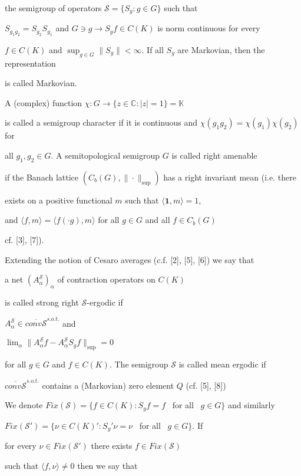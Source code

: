 \documentclass{amsart}
\theoremstyle{definition}
\theoremstyle{remark}
\numberwithin{equation}{section}
\begin{document}
the semigroup of operators $\mathcal{S} = \{ S_g : g\in G \}$ such that

$S_{g_1g_2} = S_{g_2}S_{g_1}$ and $G \ni g \to S_gf \in C(K)$ is norm continuous for every

$f\in C(K)$ and $\sup_{g\in G} \| S_g \| < \infty$. If all $S_g$ are Markovian, then the representation

is called Markovian.

A (complex) function $\chi : G \to \{ z\in \mathbb{C} : |z| = 1 \} = \mathbb{K} $

is called a semigroup character if it is continuous and $\chi(g_1g_2) = \chi (g_1)\chi (g_2)$ for

all $g_1, g_2 \in G$. A semitopological semigroup $G$ is called right amenable

if the Banach lattice  $(C_b(G), \| \cdot \|_{\sup}) $ has a right invariant mean (i.e. there

exists on  a positive functional $m$ such that $\langle \mathbf{1} , m \rangle  = 1, $

and $\langle f, m \rangle = \langle f(\cdot g), m \rangle  $ for all $g\in G $ and all $f\in C_b(G)$

cf. [3], [7]).



Extending the notion of Cesaro averages (c.f. [2], [5], [6]) we say that

a net $(A_{\alpha }^{\mathcal{S}})_{\alpha }$ of contraction operators on $C(K)$

is called strong right $\mathcal{S}$-ergodic if

$A_{\alpha}^{\mathcal{S}} \in \overline{conv\mathcal{S}}^{s.o.t.}$ and

$\lim_{\alpha} \| A_{\alpha}^{\mathcal{S}}f -  A_{\alpha}^{\mathcal{S}}S_gf \|_{\sup} = 0$

for all $g\in G$ and $f\in C(K)$. The semigroup $\mathcal{S}$ is called mean ergodic if

$\overline{conv \mathcal{S}}^{s.o.t.}$ contains a (Markovian) zero element $Q$ (cf. [5], [8])

We denote $Fix(\mathcal{S}) = \{ f\in C(K) : S_gf = f  $ \ for all \ $g\in G \}$ and similarly

$Fix(\mathcal{S}') = \{ \nu\in C(K)' : S_g'\nu  = \nu  $ \ for all \ $g\in G \}$. If

for every $\nu \in Fix(\mathcal{S}')$ there exists $f\in Fix(\mathcal{S})$

such that $\langle f , \nu \rangle \neq 0 $ then we say that
\end{document}
